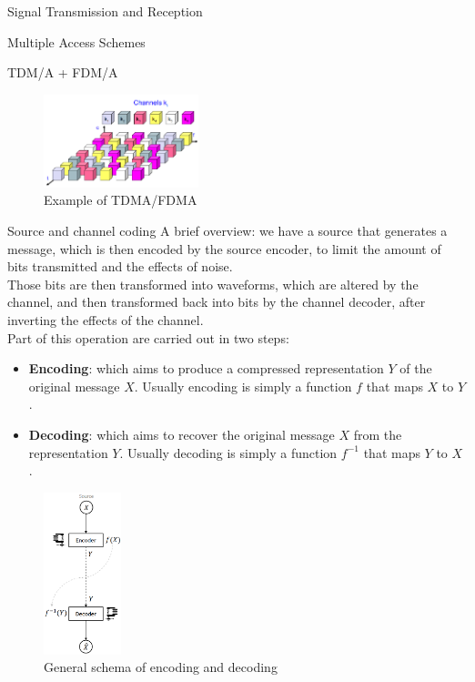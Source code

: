 \begin{section}{Signal Transmission and Reception}
\begin{subsection}{Multiple Access Schemes}
\begin{subsubsection}{TDM/A + FDM/A}
\begin{figure}[h]
        \centering
        \includegraphics[width=0.4\textwidth]{img/wireless/TFDM.png}
        \caption{Example of TDMA/FDMA}
        \label{fig:TDMA/FDMA}
      \end{figure}
    \end{subsubsection}
  \end{subsection}

  \begin{section}{Source and channel coding}
    A brief overview: we have a source that generates a message, which is then encoded by the source
    encoder, to limit the amount of bits transmitted and the effects of noise.\\
    Those bits are then transformed into waveforms, which are altered by the channel, and then
    transformed back into bits by the channel decoder, after inverting the effects of the channel.\\

    Part of this operation are carried out in two steps:
    \begin{itemize}
      \item \textbf{Encoding}: which aims to produce a compressed representation $Y$ of the original
        message $X$. Usually encoding is simply a function $f$ that maps $X$ to $Y$.
      \item \textbf{Decoding}: which aims to recover the original message $X$ from the representation
        $Y$. Usually decoding is simply a function $f^{-1}$ that maps $Y$ to $X$.
    \end{itemize}
    \begin{figure}[h]
      \centering
      \includegraphics[width=0.2\textwidth]{img/wireless/encoding and decoding.png}
      \caption{General schema of encoding and decoding}
      \label{fig:encoding and decoding}
    \end{figure}


\end{section}
\end{section}
